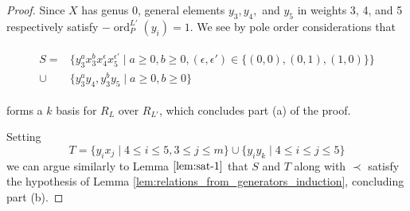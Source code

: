 \documentclass{amsart}
\theoremstyle{plain}
\theoremstyle{definition}
\theoremstyle{remark}
\numberwithin{equation}{section}
\DeclareMathOperator{\ord}{ord}
\newcommand{\halfcan}{L}
\DeclareMathOperator{\initial}{in_\prec}
\begin{document}
\begin{proof}
Since $X$ has genus 0, general
elements $y_3, y_4,$ and $y_5$ in weights 3, 4, and 5 respectively satisfy $- \ord_P^{\halfcan'}(y_i) =
1$.   We see by pole order considerations that

\begin{align}
\label{eqn:add_one_generator}
	\begin{split}
		S=	&\{ y_3^ax_3^b x_4^\epsilon x_5^{\epsilon'} \mid a \geq 0, b 
		\geq 0,(\epsilon,\epsilon') \in \{(0,0),(0,1),(1,0)\} \} \\
		\cup \;&\{y_3^ay_4, y_3^by_5 \mid a \geq 0, b \geq 0 \}
	\end{split}
\end{align}

\noindent forms a $k$ basis for $R_\halfcan$ over $R_{\halfcan'}$, which concludes part (a) of the proof.

Setting
\[
	T = \{ y_i x_j \mid 4 \leq i \leq 5, 3 \leq j \leq m\} \cup \{ y_i y_k \mid 4 \leq i \leq j \leq 5\} 
\]
we can argue similarly to Lemma $\ref{lem:sat-1}$ that $S$ and $T$ along with $\prec$ satisfy the hypothesis of Lemma \ref{lem:relations_from_generators_induction}, concluding part (b).



%
%
%
%
%
%


\end{proof}
\end{document}
